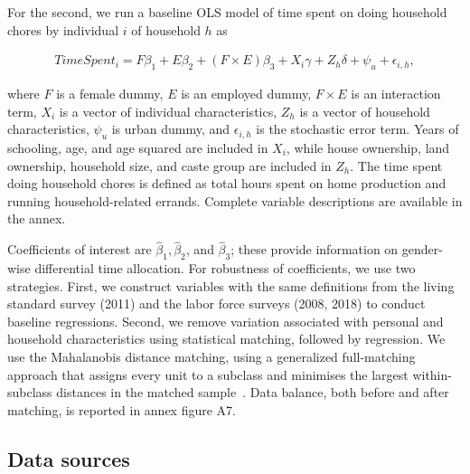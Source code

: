 For the second, we run a baseline OLS model of time spent on doing household chores by individual $i$ of household $h$ as
\begin{linenomath*}\begin{align}
	TimeSpent_{i} = F\beta_{1} + E\beta_{2} + (F\times E)\beta_{3} + X_{i}\gamma+ Z_{h}\delta+ \psi_{u} + \epsilon_{i,h},
	\end{align}\end{linenomath*} 
where $F$ is a female dummy, $E$ is an employed dummy, $F\times E$ is an interaction term, $X_{i}$ is a vector of individual characteristics, $Z_{h}$ is a vector of household characteristics, $\psi_{u}$ is urban dummy, and $\epsilon_{i,h}$ is the stochastic error term. Years of schooling, age, and age squared are included in $X_{i}$, while house ownership, land ownership, household size, and caste group are included in $Z_{h}$.  The time spent doing household chores is defined as total hours spent on home production and running household-related errands. Complete variable descriptions are available in the annex.\par

Coefficients of interest are $\hat{\beta}_{1}, \hat{\beta}_{2}$, and $\hat{\beta}_{3}$; these provide information on gender-wise differential time allocation. For robustness of coefficients, we use two strategies. First, we construct variables with the same definitions from the living standard survey (2011) and the labor force surveys (2008, 2018) to conduct baseline regressions. Second, we remove variation associated with personal and household characteristics using statistical matching, followed by regression. We use the Mahalanobis distance matching, using a generalized full-matching approach that assigns every unit to a subclass and minimises the largest within-subclass distances in the matched sample~\citep{Savje2021}. Data balance, both before and after matching, is reported in annex figure A7.\par 

\subsection{Data sources}

